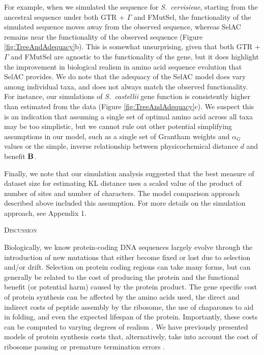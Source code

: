\documentclass[12pt,letterpaper,fleqn]{article}
\renewcommand{\section}[1]{%
\bigskip
\begin{center}
\begin{Large}
\normalfont\scshape #1
\medskip
\end{Large}
\end{center}}
\newcommand{\Func}{\ensuremath{\text{\textbf{B}}}\xspace}
\newcommand{\selac}{SelAC\xspace}
\newcommand{\alphag}{\ensuremath{\alpha_G}\xspace}
\begin{document}
For example, when we simulated the sequence for \emph{S.~cervisieae}, starting from the ancestral sequence under both GTR + $\Gamma$ and FMutSel, the functionality of the simulated sequence moves away from the observed sequence, whereas SelAC remains near the functionality of the observed sequence (Figure \ref{fig:TreeAndAdequacy}b).
This is somewhat unsurprising, given that both GTR + $\Gamma$ and FMutSel are agnostic to the functionality of the gene, but it does highlight the improvement in biological realism in amino acid sequence evolution that \selac provides.
We do note that the adequacy of the \selac model does vary among individual taxa, and does not always match the observed functionality.
For instance, our simulations of \emph{S.~castellii} gene function is consistently higher than estimated from the data (Figure \ref{fig:TreeAndAdequacy}c).
We suspect this is an indication that assuming a single set of optimal amino acid across all taxa may be too simplistic, but we cannot rule out other potential simplifying assumptions in our model, such as a single set of Grantham weights and $\alphag$ values or the simple, inverse relationship between physicochemical distance $d$ and benefit \Func.

Finally, we note that our simulation analysis suggested that the best measure of dataset size for estimating KL distance uses a scaled value of the product of number of sites and number of characters.
The model comparison approach described above included this assumption.
For more details on the simulation approach, see Appendix 1.


\section{Discussion}
Biologically, we know protein-coding DNA sequences largely evolve through the introduction of new mutations that either become fixed or lost due to selection and/or drift.
Selection on protein coding regions can take many forms, but can generally be related to the cost of producing the protein and the functional benefit (or potential harm) caused by the protein product.
The gene specific cost of protein synthesis can be affected by the amino acids used, the direct and indirect costs of peptide assembly by the ribosome, the use of chaparones to aid in folding, and even the expected lifespan of the protein.
Importantly, these costs can be computed to varying degrees of realism \citep[e.g.][]{Wagner2005,LynchAndMarinov2015}.
We have previously presented models of protein synthesis costs that, alternatively, take into account the cost of ribosome pausing \citep{ShahAndGilchrist2011} or premature termination errors \citep{GilchristAndWagner2006,Gilchrist2007,GilchristEtAl2009}.
\end{document}
